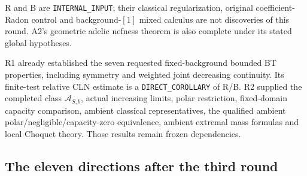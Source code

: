 \documentclass[11pt,a4paper]{article}
\numberwithin{equation}{section}
\theoremstyle{definition}
\theoremstyle{remark}
\begin{document}
R and B are \texttt{INTERNAL\_INPUT}; their classical regularization,
original coefficient-Radon control and background-$[1]$ mixed calculus
are not discoveries of this round. A2's geometric adelic nefness
theorem is also complete under its stated global hypotheses.

R1 already established the seven requested fixed-background bounded
BT properties, including symmetry and weighted joint decreasing
continuity. Its finite-test relative CLN estimate is a
\texttt{DIRECT\_COROLLARY} of R/B. R2 supplied the completed class
$\mathcal A_{S,b}$, actual increasing limits, polar restriction,
fixed-domain capacity comparison, ambient classical representatives,
the qualified ambient polar/negligible/capacity-zero equivalence,
ambient extremal mass formulas and local Choquet theory. Those
results remain frozen dependencies.

\subsection{The eleven directions after the third round}
\end{document}
